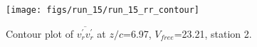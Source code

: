 \begin{figure}[H]
\centering
\texttt{[image: figs/run\_15/run\_15\_rr\_contour]}
\caption{Contour plot of $\overline{v_{r}^{\prime} v_{r}^{\prime}}$ at $z/c$=6.97, $V_{free}$=23.21, station 2.}
\label{fig:run_15_rr_contour}
\end{figure}


